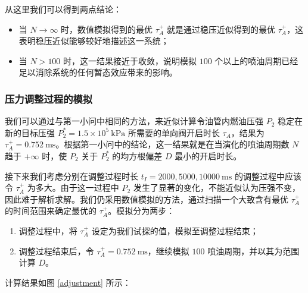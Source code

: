 \documentclass[withoutpreface,bwprint]{cumcmthesis}
\newcommand{\prb}{\times 10^5~\mathrm{kPa}}
\newcommand{\tim}{~\mathrm{ms}}
\begin{document}
从这里我们可以得到两点结论：

\begin{itemize}
	\item 当 $N\to\infty$ 时，数值模拟得到的最优 $\tau_A^+$ 就是通过稳压近似得到的最优 $\tau_A^+$，这表明稳压近似能够较好地描述这一系统；
	\item 当 $N>100$ 时，这一结果接近于收敛，说明模拟 $100$ 个以上的喷油周期已经足以消除系统的任何暂态效应带来的影响。
\end{itemize}
\subsubsection{压力调整过程的模拟}
我们可以通过与第一小问中相同的方法，来近似计算令油管内燃油压强 $P_2$ 稳定在新的目标压强 $P_2^*=1.5\prb$ 所需要的单向阀开启时长 $\tau_A$，结果为 $\tau_A^+ = 0.752\tim$。根据第一小问中的结论，这一结果就是在当演化的喷油周期数 $N$ 趋于 $+\infty$ 时，使 $P_2$ 关于 $P_2^*$ 的均方根偏差 $D$ 最小的开启时长。

接下来我们考虑分别在调整过程时长 $t_I=2000, 5000, 10000\tim$ 的调整过程中应该令 $\tau_A^+$ 为多大。由于这一过程中 $P_2$ 发生了显著的变化，不能近似认为压强不变，因此难于解析求解。我们仍采用数值模拟的方法，通过扫描一个大致含有最优 $\tau_A^+$ 的时间范围来确定最优的 $\tau_A^+$。模拟分为两步：

\begin{enumerate}
	\item 调整过程中，将 $\tau_A^+$ 设定为我们试探的值，模拟至调整过程结束；
	\item 调整过程结束后，令 $\tau_A^+=0.752\tim$，继续模拟 $100$ 喷油周期，并以其为范围计算 $D$。
\end{enumerate}

计算结果如图 \ref{adjustment} 所示：
\end{document}
